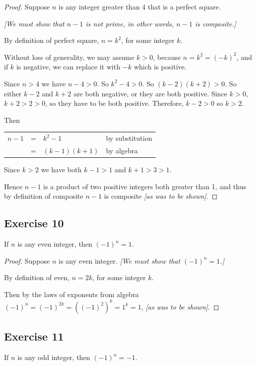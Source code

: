\documentclass[14pt]{extarticle}
\newcommand{\cy}{\color{cyan}}
\begin{document}
\begin{proof}
Suppose $n$ is any integer greater than 4 that is a perfect square. 

{\it [We must show that $n-1$ is not prime, in other words, $n-1$ is composite.]}

By definition of perfect square, $n = k^2$, for some integer $k$. 

Without loss of generality, we may assume $k > 0$, because $n = k^2 = (-k)^2$, and if $k$ is negative, we can replace it with $-k$ which is positive.

Since $n > 4$ we have $n - 4 > 0$. So $k^2 - 4 > 0$. So $(k-2)(k+2) > 0$. So either $k-2$ and $k+2$ are both negative, or they are both positive. Since $k > 0$, $k+2>2>0$, so they have to be both positive. Therefore, $k - 2 > 0$ so $k > 2$.

Then

\begin{center}
\begin{tabular}{rcll}
$n-1$ & = & $k^2-1$ & \cy by substitution \\
& = & $(k-1)(k+1)$ & \cy by algebra \\
\end{tabular}
\end{center}

Since $k>2$ we have both $k-1>1$ and $k+1>3>1$.

Hence $n-1$ is a product of two positive integers both greater than 1, and thus by definition of composite $n-1$ is composite {\it [as was to be shown]}.
\end{proof}

\subsection{Exercise 10}
If $n$ is any even integer, then $(-1)^n = 1$.

\begin{proof}
Suppose $n$ is any even integer. {\it [We must show that $(-1)^n = 1$.]}

By definition of even, $n = 2k$, for some integer $k$. 

Then by the laws of exponents from algebra $(-1)^n = (-1)^{2k} = ((-1)^2)^k = 1^k = 1$, {\it [as was to be shown]}.
\end{proof}

\subsection{Exercise 11}
If $n$ is any odd integer, then $(-1)^n = -1$.
\end{document}
